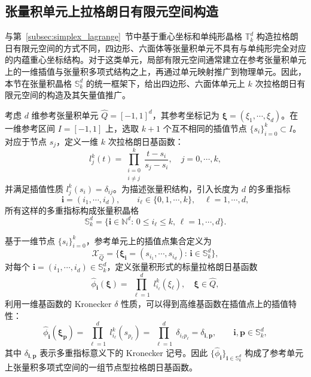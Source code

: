 

\subsection{张量积单元上拉格朗日有限元空间构造}
\label{subsec:tensor_lagrange}

与第~\ref{subsec:simplex_lagrange}~节中基于重心坐标和单纯形晶格 $\mathbb{T}_k^d$ 构造拉格朗日有限元空间的方式不同，四边形、六面体等张量积单元不具有与单纯形完全对应的内蕴重心坐标结构。对于这类单元，局部有限元空间通常建立在参考张量积单元上的一维插值与张量积多项式结构之上，再通过单元映射推广到物理单元。因此，本节在张量积晶格 $\mathbb{S}_k^d$ 的统一框架下，给出四边形、六面体单元上 $k$ 次拉格朗日有限元空间的构造及其矢量值推广。

考虑 $d$ 维参考张量积单元  $\hat{Q} = [-1,1]^d$，其参考坐标记为 $\boldsymbol{\xi} = (\xi_1,\cdots,\xi_d)$。在一维参考区间 $I = [-1,1]$ 上，选取 $k+1$ 个互不相同的插值节点 $\{s_i\}_{i=0}^k\subset{I}$。对应于节点 $s_j$，定义一维 $k$ 次拉格朗日基函数：
\[
l_j^k(t) = \prod_{\substack{i=0 \\ i\neq j}}^k \frac{t-s_i}{s_j-s_i}, \quad j=0,\cdots,k,
\]
并满足插值性质 $l_j^k(s_i) = \delta_{ij}$。为描述张量积结构，引入长度为 $d$ 的多重指标
\[
\boldsymbol{i} = (i_1,\cdots,i_d),\qquad{i}_{\ell}\in\{0,1,\cdots,k\},\quad\ell=1,\cdots,d,
\]
所有这样的多重指标构成张量积晶格
\[
\mathbb{S}_k^d = \{\boldsymbol{i}\in\mathbb{N}^d:\,0\leq{i}_\ell\leq{k},\,\ell=1,\cdots,d\}.
\]

基于一维节点 $\{s_i\}_{i=0}^k$，参考单元上的插值点集合定义为
\[
\mathcal{X}_{\hat{Q}} = \{\boldsymbol{\xi}_{\boldsymbol{i}} = (s_{i_1},\cdots,s_{i_d}):\,\boldsymbol{i}\in\mathbb{S}_k^d\},
\]
对每个 $\boldsymbol{i} = (i_1,\cdots,i_d)\in\mathbb{S}_k^d$，定义张量积形式的标量拉格朗日基函数
\[
\hat{\phi}_{\boldsymbol{i}}(\boldsymbol{\xi}) = \prod_{\substack{\ell=1}}^dl_{i_\ell}^k(\xi_\ell),\quad\boldsymbol{\xi}\in\hat{Q},
\]
利用一维基函数的 Kronecker $\delta$ 性质，可以得到高维基函数在插值点上的插值特性：
\[
\hat{\phi}_{\boldsymbol{i}}(\boldsymbol{\xi}_{\boldsymbol{p}}) = \prod_{\substack{\ell=1}}^dl_{i_\ell}^k(s_{p_\ell}) = \prod_{\substack{\ell=1}}^d\delta_{i_{\ell}p_{\ell}} = \delta_{\boldsymbol{i},\boldsymbol{p}},\qquad\boldsymbol{i},\boldsymbol{p}\in\mathbb{S}_k^d,
\]
其中 $\delta_{\boldsymbol{i},\boldsymbol{p}}$ 表示多重指标意义下的 Kronecker 记号。因此 $\{\hat{\phi}_{\boldsymbol{i}}\}_{\boldsymbol{i}\in\mathbb{S}_k^d}$ 构成了参考单元上张量积多项式空间的一组节点型拉格朗日基函数。

